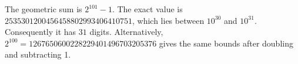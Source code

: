The geometric sum is $2^{101}-1$. The exact value is $2535301200456458802993406410751$, which lies between $10^{30}$ and $10^{31}$. Consequently it has $\boxed{31}$ digits. Alternatively, $2^{100}=1267650600228229401496703205376$ gives the same bounds after doubling and subtracting 1.
